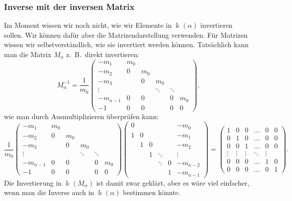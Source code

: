 \subsubsection{Inverse mit der inversen Matrix}
Im Moment wissen wir noch nicht, wie wir Elemente in $\Bbbk(\alpha)$ 
invertieren sollen.
Wir können dafür aber die Matrizendarstellung verwenden.
Für Matrizen wissen wir selbstverständlich, wie sie invertiert
werden können.
Tatsächlich kann man die Matrix $M_\alpha$ z.~B.~direkt invertieren:
\[
M_\alpha^{-1}
=
\frac{1}{m_0}
\begin{pmatrix}
   -m_1 &m_0&   &      &      &   \\
   -m_2 & 0 &m_0&      &      &   \\
   -m_3 &   & 0 &   m_0&      &   \\
 \vdots &   &   &\ddots&\ddots&   \\
-m_{n-1}& 0 & 0 &      &  0   &m_0\\
    -1  & 0 & 0 &      &  0   & 0
\end{pmatrix},
\]
wie man durch Ausmultiplizieren überprüfen kann:
\[
\frac{1}{m_0}
\begin{pmatrix}
   -m_1 &m_0&   &      &      &   \\
   -m_2 & 0 &m_0&      &      &   \\
   -m_3 &   & 0 &   m_0&      &   \\
 \vdots &   &   &\ddots&\ddots&   \\
-m_{n-1}& 0 & 0 &      &  0   &m_0\\
    -1  & 0 & 0 &      &  0   & 0
\end{pmatrix}
\begin{pmatrix}
  0   &    &    &      &   &-m_0    \\
  1   & 0  &    &      &   &-m_1    \\
      & 1  & 0  &      &   &-m_2    \\
      &    & 1  &\ddots&   &\vdots  \\
      &    &    &\ddots& 0 &-m_{n-2}\\
      &    &    &      & 1 &-m_{n-1}
\end{pmatrix}
=
\begin{pmatrix}
1&0&0&\dots&0&0\\
0&1&0&\dots&0&0\\
0&0&1&\dots&0&0\\
\vdots&\vdots&\vdots&\ddots&\vdots\\
0&0&0&\dots&1&0\\
0&0&0&\dots&0&1
\end{pmatrix}.
\]
Die Invertierung in $\Bbbk(M_\alpha)$ ist damit zwar geklärt, aber
es wäre viel einfacher, wenn man die Inverse auch in $\Bbbk(\alpha)$
bestimmen könnte.

